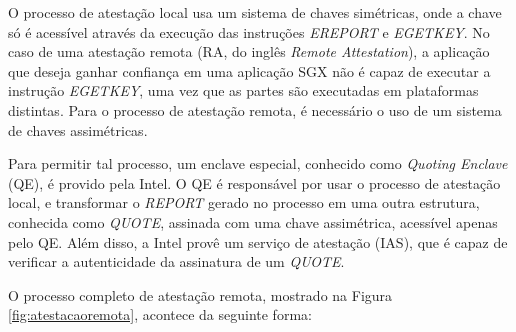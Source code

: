 O processo de atestação local usa um sistema de chaves simétricas, onde a chave
só é acessível através da execução das instruções \textit{EREPORT} e \textit{
EGETKEY}. No caso de uma atestação remota (RA, do inglês \textit{Remote
Attestation}), a aplicação que deseja ganhar confiança em uma aplicação SGX não
é capaz de executar a instrução \textit{EGETKEY}, uma vez que as partes são
executadas em plataformas distintas. Para o processo de atestação remota, é
necessário o uso de um sistema de chaves assimétricas.

Para permitir tal processo, um enclave especial, conhecido como \textit{Quoting
Enclave} (QE), é provido pela Intel. O QE é responsável por usar o processo de
atestação local, e transformar o \textit{REPORT} gerado no processo em uma outra
estrutura, conhecida como \textit{QUOTE}, assinada com uma chave assimétrica,
acessível apenas pelo QE.
Além disso, a Intel provê um serviço de atestação (IAS), que é capaz de
verificar a autenticidade da assinatura de um \textit{QUOTE}.

O processo completo de atestação remota, mostrado na Figura
\ref{fig:atestacaoremota}, acontece da seguinte forma:

